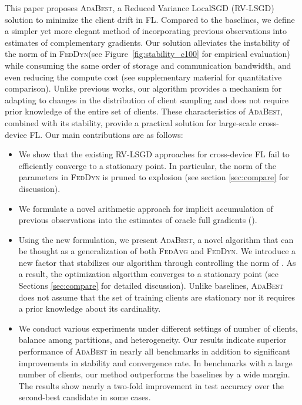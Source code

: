 \documentclass[runningheads]{llncs}
\def\figref#1{Figure~\ref{#1}}
\newcommand{\fedavg}{\textsc{FedAvg}\xspace}
\newcommand{\feddyn}{\textsc{FedDyn}\xspace}
\newcommand{\ours}{\textsc{AdaBest}\xspace}
\newcommand{\rvlsgd}{\textsc{RV-LSGD}\xspace}
\begin{document}
This paper proposes \ours, a Reduced Variance LocalSGD (\rvlsgd) solution to minimize the client drift in FL. Compared to the baselines, we define a simpler yet more elegant method of incorporating previous observations into estimates of complementary gradients. Our solution alleviates the instability of the norm of  in \feddyn (see \figref{fig:stability_c100} for empirical evaluation) while consuming the same order of storage and communication bandwidth, and even reducing the compute cost (see supplementary material for quantitative comparison). 
Unlike previous works, our algorithm provides a mechanism for adapting to changes in the distribution of client sampling and does not require prior knowledge of the entire set of clients.
These characteristics of \ours, combined with its stability, provide a practical solution for large-scale cross-device FL. Our main contributions are as follows:

\begin{itemize}
    \item We show that the existing \rvlsgd approaches for cross-device FL fail to efficiently converge to a stationary point. In particular, the norm of the parameters in \feddyn is pruned to explosion (see section \ref{sec:compare} for discussion).
    \item We formulate a novel arithmetic approach for implicit accumulation of previous observations into the estimates of oracle full gradients ().
    \item Using the new formulation, we present \ours, a novel algorithm that can be thought as a generalization of both \fedavg and \feddyn. We introduce a new factor  that stabilizes our algorithm through controlling the norm of . As a result, the optimization algorithm converges to a stationary point (see Sections \ref{sec:compare} for detailed discussion). Unlike baselines, \ours does not assume that the set of training clients are stationary nor it requires a prior knowledge about its cardinality.
    \item We conduct various experiments under different settings of number of clients, balance among partitions, and heterogeneity. 
    Our results indicate superior performance of \ours in nearly all benchmarks 
in addition to significant improvements in stability and convergence rate. 
    In benchmarks with a large number of clients, our method outperforms the baselines by a wide margin. 
    The results show nearly a two-fold improvement in test accuracy over the second-best candidate in some cases.
\end{itemize}
\end{document}

